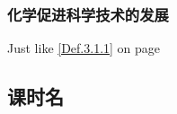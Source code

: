 \documentclass[color=BLUE]{textbook-cn}%
\begin{document}
\begin{Paracol}
\begin{Theorem}[定理名称]
\lipsum[1][2-6]
\end{Theorem}


\begin{Proof}
\lipsum[1]
\end{Proof}




\begin{Lemma}[引理名称]
\zhlipsum[2]
\end{Lemma}


\begin{Proposition}[命题名称命题名称命题名称命题名称命题名称]
\zhlipsum[2]
\end{Proposition}

\begin{Warning}
\lipsum[1][1-3]
\end{Warning}


\subsubsection{化学促进科学技术的发展}

\lipsum[1-2]




\Answer{\lipsum[1][1-7]}




\begin{Definition*}[定义名称]
\lipsum[1][1-3]
\end{Definition*}

Just like \ref{Def.3.1.1} on page \pageref{Def.3.1.1}





\begin{Link}
\zhlipsum
\end{Link}



\lipsum[2]

\begin{Practice}
\lipsum[1][1-5]
\end{Practice}


\subsection{课时名}
\lipsum[3]


\end{Paracol}
\end{document}
